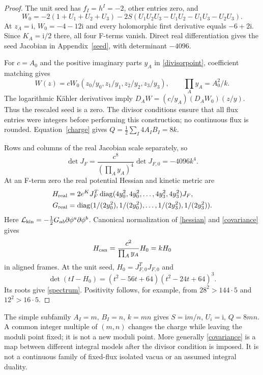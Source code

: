 \documentclass[11pt]{article}
\newcommand{\ii}{\mathrm{i}}
\newcommand{\diag}{\operatorname{diag}}
\begin{document}
\begin{proof}
The unit seed has $f_I=h^I=-2$, other entries zero, and
\begin{equation}
W_0=-2(1+U_1+U_2+U_3)
 -2S(U_1U_2U_3-U_1U_2-U_1U_3-U_2U_3).
\end{equation}
At $z_A=\ii$, $W_0=-4-12\ii$ and every holomorphic first derivative equals
$-6+2\ii$. Since $K_A=\ii/2$ there, all four F-terms vanish. Direct real
differentiation gives the seed Jacobian in Appendix~\ref{seed}, with
determinant $-4096$.

For $c=A_0$ and the positive imaginary parts $y_A$ in
\eqref{divisorpoint}, coefficient matching gives
\begin{equation}
W(z)=cW_0(z_0/y_0,z_1/y_1,z_2/y_2,z_3/y_3),\qquad
\prod_Ay_A=A_0^2/k.
\label{covariance}
\end{equation}
The logarithmic K\"ahler derivatives imply
$D_AW=(c/y_A)(D_AW_0)(z/y)$. Thus the rescaled seed is a zero. The divisor
conditions ensure that all flux entries were integers before performing
this construction; no continuous flux is rounded. Equation~\eqref{charge}
gives $Q=\frac12\sum_I4A_IB_I=8k$.

Rows and columns of the real Jacobian scale separately, so
\begin{equation}
\det J_F=\frac{c^8}{(\prod_Ay_A)^4}\det J_{F,0}=-4096k^4.
\end{equation}
At an F-term zero the real potential Hessian and kinetic metric are
\begin{align}
H_{\rm real}&=2e^KJ_F^T\diag(4y_0^2,4y_0^2,\ldots,4y_3^2,4y_3^2)J_F,
\label{hessian}\\
G_{\rm real}&=\diag(1/(2y_0^2),1/(2y_0^2),\ldots,1/(2y_3^2),1/(2y_3^2)).
\end{align}
Here $\mathcal L_{\rm kin}=-\frac12G_{ab}\partial\phi^a\partial\phi^b$.
Canonical normalization of \eqref{hessian} and \eqref{covariance} gives
\begin{equation}
H_{\rm can}=\frac{c^2}{\prod_Ay_A}H_0=kH_0
\end{equation}
in aligned frames. At the unit seed,
$H_0=J_{F,0}^TJ_{F,0}$ and
\begin{equation}
\det(tI-H_0)=(t^2-56t+64)(t^2-24t+64)^3.
\end{equation}
Its roots give \eqref{spectrum}. Positivity follows, for example, from
$28^2>144\cdot5$ and $12^2>16\cdot5$.
\end{proof}

The simple subfamily $A_I=m$, $B_I=n$, $k=mn$ gives
$S=\ii m/n$, $U_i=\ii$, $Q=8mn$. A common integer multiple of $(m,n)$
changes the charge while leaving the moduli point fixed; it is not a new
moduli point. More generally \eqref{covariance} is a map between different
integral models after the divisor condition is imposed. It is not a
continuous family of fixed-flux isolated vacua or an assumed integral
duality.
\end{document}
